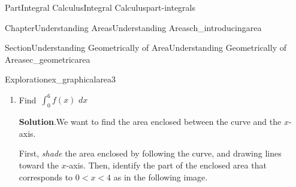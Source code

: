 \documentclass{tufte-book}
\newcommand{\blocktitlefont}{\relax}
\numberwithin{equation}{chapter}
\newcommand{\intdx}[1]{{\,\int#1\,\,dx}}
\newcommand{\lt}{<}
\begin{document}
\begin{partptx}{Part}{Integral Calculus}{}{Integral Calculus}{}{}{part-integrals}
\begin{chapterptx}{Chapter}{Understanding Areas}{}{Understanding Areas}{}{}{ch_introducingarea}
\begin{sectionptx}{Section}{Understanding Geometrically of Area}{}{Understanding Geometrically of Area}{}{}{sec_geometricarea}
\begin{exploration}{Exploration}{}{ex_graphicalarea3}
\begin{enumerate}[font=\bfseries,label=(\alph*),ref=\alph*]
\begin{image}{0.25}{0.5}{0.25}{}
{
}%
\end{image}%
The shaded area can be divided into \emph{three} regions:%
\begin{enumerate}
\item{}A triangle with base \(0\lt x\lt 2\) (\(b=2\)) and height \(h=1\) \emph{above} the \(x\)-axis.%
\item{}A triangle with base \(2\lt x\lt 3\) (\(b=1\)) and height \(h=1\) \emph{below} the \(x\)-axis.%
\item{}A rectangle with base \(3\lt x \lt 4\) (\(b=1\)) and height \(h=1\) \emph{below} the \(x\)-axis.%
\end{enumerate}
Putting this together,%
\begin{equation*}
\intdx{_0^6 f(x) } = (+) \frac{1}{2}\cdot 2 \cdot 1 + (-)\frac{1}{2}\cdot 1 \cdot 1 + (-)1\cdot 1 = -0.5
\end{equation*}
%
\item{}Find \(\intdx{_0^6 f(x) }\)%
\par\smallskip%
\noindent\textbf{\blocktitlefont Solution}.\hypertarget{ex_graphicalarea3-5-2}{}\quad{}We want to find the area enclosed between the curve and the \(x\)-axis.%
\par
First, \emph{shade} the area enclosed by following the curve, and drawing lines toward the \(x\)-axis. Then, identify the part of the enclosed area that corresponds to \(0\lt x \lt 4\) as in the following image.%
\begin{image}{0.25}{0.5}{0.25}{}%
\end{image}
\end{enumerate}
\end{exploration}
\end{sectionptx}
\end{chapterptx}
\end{partptx}
\end{document}
